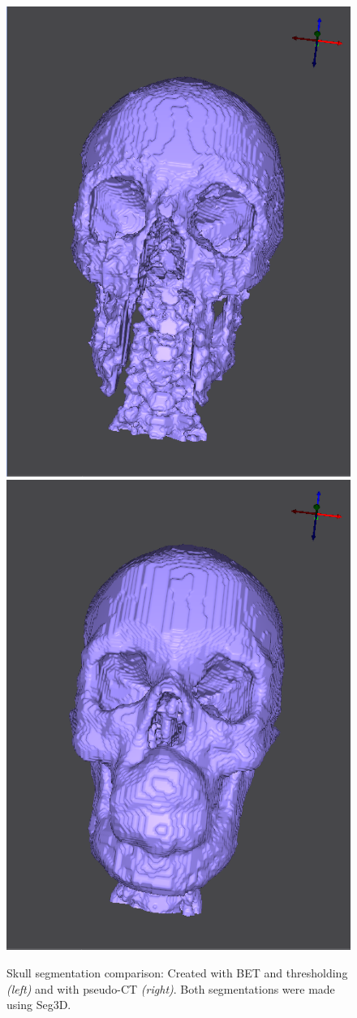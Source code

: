 \begin{figure}[H]
\begin{center}
\includegraphics[width=.49\textwidth]{Figures/skull_before}
\includegraphics[width=.49\textwidth]{Figures/skull_after}
\caption{Skull segmentation comparison: Created with BET and thresholding \textit{(left)} and with pseudo-CT \textit{(right)}. Both segmentations were made using Seg3D.}
\label{fig:skull}
\end{center}
\end{figure}

